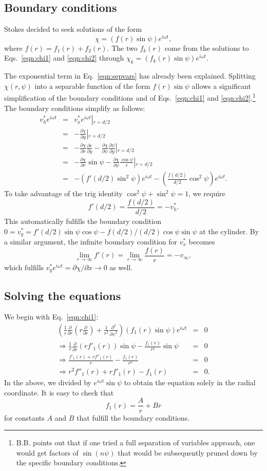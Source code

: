 \documentclass[11pt]{amsart}
\newcommand{\vinf}{v_{\infty}}
\newcommand{\om}{\omega}
\newcommand{\bee}[1]{\begin{equation} #1 \end{equation}}
\newcommand{\bees}[1]{\begin{equation*} #1 \end{equation*}}
\newcommand{\baas}[1]{\begin{eqnarray*} #1 \end{eqnarray*}}
\newcommand{\pd}[2]{\ensuremath{\frac{\partial #1}{\partial #2}}}
\newcommand{\pdd}[2]{\ensuremath{\frac{\partial^2 #1}{\partial {#2}^2}}}
\begin{document}
\subsection{Boundary conditions}

Stokes decided to seek solutions of the form
\bee{
\chi = \left(f(r)\sin\psi\right) e^{i\om t}, \label{eqn:sepvars}
}
where $f(r) = f_1(r) + f_2(r)$. The two $f_k(r)$ come from the solutions to Eqs.~\eqref{eqn:chi1} and \eqref{eqn:chi2} through $\chi_k = \left(f_k(r)\sin\psi\right) e^{i\om t}$.

The exponential term in Eq.~\eqref{eqn:sepvars} has already been explained. Splitting $\chi(r,\psi)$ into a separable function of the form $f(r)\sin\psi$ allows a significant simplification of the boundary conditions and of Eqs.~\eqref{eqn:chi1} and \eqref{eqn:chi2}.\footnote{B.B. points out that if one tried a full separation of variables approach, one would get factors of $\sin(n\psi)$ that would be subsequently pruned down by the specific boundary conditions.} The boundary conditions simplify as follows:
\baas{
v_h^*e^{i \om t} &=& v_x^*e^{i \om t}\left\vert_{r=d/2}\right.\\
&=& -\pd{\chi}{y} \left\vert_{r=d/2}\right.\\
&=& -\pd{\chi}{r}\pd{r}{y} - \pd{\chi}{\psi}\pd{\psi}{y} \left\vert_{r=d/2}\right.\\
&=& -\pd{\chi}{r}\sin\psi - \pd{\chi}{\psi}\frac{\cos\psi}{r} \left\vert_{r=d/2}\right.\\
&=& -\left(f'(d/2)\sin^2\psi\right) e^{i \om t} - \left(\frac{f(d/2)}{d/2}\cos^2\psi\right) e^{i \om t}.
}
To take advantage of the trig identity $\cos^2\psi + \sin^2\psi = 1$, we require
\bee{
f'(d/2) = \frac{f(d/2)}{d/2} = -v_h^* \label{eqn:cylBCs}.
}
This automatically fulfills the boundary condition $0 = v_y^* = f'(d/2)\sin\psi\cos\psi - f(d/2)/(d/2)\cos\psi\sin\psi$ at the cylinder. By a similar argument, the infinite boundary condition for $v_x^*$ becomes
\bee{
\lim\limits_{r\to\infty} f'(r) =  \lim\limits_{r\to\infty} \frac{f(r)}{r} = -\vinf \label{eqn:infBCs},
}
which fulfills $v_y^*e^{i \om t} = \partial\chi/\partial x \to 0$ as well.

\subsection{Solving the equations}

We begin with Eq.~\ref{eqn:chi1}:
\baas{
\left( \frac{1}{r}\pd{}{r}\left(r\pd{}{r}\right) + \frac{1}{r^2}\pdd{}{\psi} \right) \left(f_1(r)\sin\psi\right) e^{i \om t} &=& 0 \\
\Rightarrow \frac{1}{r}\pd{}{r}\left(rf'_1(r)\right)\sin\psi - \frac{f_1(r)}{r^2}\sin\psi &=& 0 \\
\Rightarrow \frac{f'_1(r) + rf''_1(r)}{r} - \frac{f_1(r)}{r^2} &=& 0 \\
\Rightarrow r^2f''_1(r) + rf'_1(r) - f_1(r) &=& 0.
}
In the above, we divided by $ e^{i \om t}\sin\psi$ to obtain the equation solely in the radial coordinate. It is easy to check that 
\bees{
f_1(r) = \frac{A}{r} + Br
}	
for constants $A$ and $B$ that fulfill the boundary conditions.
\end{document}
